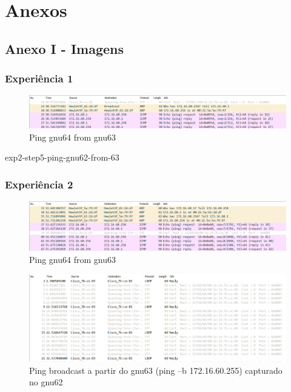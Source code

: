 \documentclass[article, a4paper, 11pt, oneside]{memoir}
\begin{document}
\newpage
\chapter[Anexos][Anexos]{Anexos} \label{\thechapter}

\section{Anexo I - Imagens}
\subsection{Experiência 1}

\begin{figure}[h]
	\centering
\includegraphics[scale=0.55]{exp1-gnu63.png}
\caption{Ping gnu64 from gnu63}
\end{figure}

exp2-step5-ping-gnu62-from-63

\subsection{Experiência 2}
\begin{figure}[h]
	\centering
\includegraphics[scale=0.55]{exp2-step5-ping-gnu64-from-gnu63.png}
\caption{Ping gnu64 from gnu63}
\end{figure}

\newpage
\begin{figure}[h]
	\centering
\includegraphics[scale=0.55]{exp2-step8-broadcast-gnu63-from-gnu62.png}
\caption{Ping broadcast a partir do gnu63 (ping –b 172.16.60.255) capturado no gnu62}
\end{figure}
\end{document}
